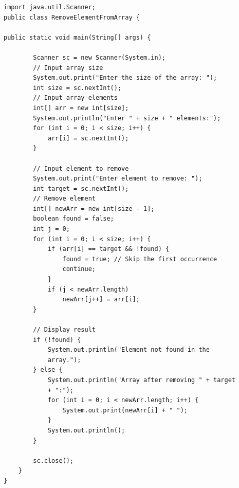 \begin{verbatim}
import java.util.Scanner;
public class RemoveElementFromArray {

public static void main(String[] args) {

        Scanner sc = new Scanner(System.in);
        // Input array size
        System.out.print("Enter the size of the array: ");
        int size = sc.nextInt();
        // Input array elements
        int[] arr = new int[size];
        System.out.println("Enter " + size + " elements:");
        for (int i = 0; i < size; i++) {
            arr[i] = sc.nextInt();
        }
        
        // Input element to remove
        System.out.print("Enter element to remove: ");
        int target = sc.nextInt();
        // Remove element
        int[] newArr = new int[size - 1];
        boolean found = false;
        int j = 0;
        for (int i = 0; i < size; i++) {
            if (arr[i] == target && !found) {
                found = true; // Skip the first occurrence
                continue;
            }
            if (j < newArr.length)
                newArr[j++] = arr[i];
        }
        
        // Display result
        if (!found) {
            System.out.println("Element not found in the 
            array.");
        } else {
            System.out.println("Array after removing " + target 
            + ":");
            for (int i = 0; i < newArr.length; i++) {
                System.out.print(newArr[i] + " ");
            }
            System.out.println();
        }
        
        sc.close();
    }
}

\end{verbatim}